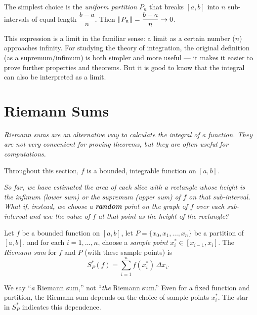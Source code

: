 \begin{example}
The simplest choice is the \emph{uniform partition} $P_n$ that breaks $[a,b]$ into $n$ sub-intervals of equal length $\dfrac{b-a}{n}$.  Then $\left\lVert P_n \right\rVert = \dfrac{b-a}{n} \to 0$.
\end{example}

\begin{remark}
This expression is a limit in the familiar sense: a limit as a certain number ($n$) approaches infinity.  For studying the theory of integration, the original definition (as a supremum/infimum) is both simpler and more useful --- it makes it easier to prove further properties and theorems.  But it is good to know that the integral can also be interpreted as a limit.
\end{remark}

\section{Riemann Sums}
\label{sec:7.10}

\textit{Riemann sums are an alternative way to calculate the integral of a function.  They are not very convenient for proving theorems, but they are often useful for computations.}

Throughout this section, $f$ is a bounded, integrable function on $[a,b]$.

\textit{So far, we have estimated the area of each slice with a rectangle whose height is the infimum (lower sum) or the supremum (upper sum) of $f$ on that sub-interval.  What if, instead, we choose a \textbf{random} point on the graph of $f$ over each sub-interval and use the value of $f$ at that point as the height of the rectangle?}

\begin{definition}
\label{def:7-14}
Let $f$ be a bounded function on $[a,b]$, let $P = \{x_0, x_1, \ldots, x_n\}$ be a partition of $[a,b]$, and for each $i = 1, \ldots, n$, choose a \emph{sample point} $x_i^{*} \in [x_{i-1}, x_i]$.  The \emph{Riemann sum} for $f$ and $P$ (with these sample points) is
\[
  S_P^{*}(f) = \sum_{i=1}^{n} f(x_i^{*})\,\Delta x_i.
\]
\end{definition}

\begin{remark}
We say ``\textit{a} Riemann sum,'' not ``\textit{the} Riemann sum.''  Even for a fixed function and partition, the Riemann sum depends on the choice of sample points $x_i^{*}$.  The star in $S_P^{*}$ indicates this dependence.
\end{remark}

